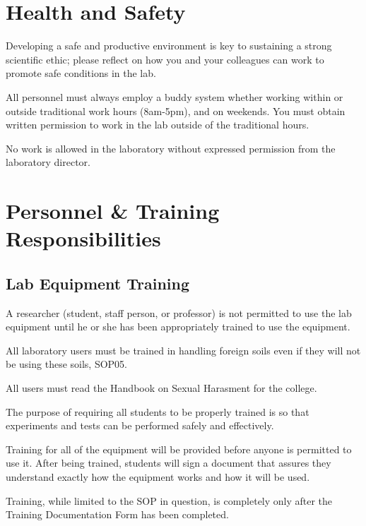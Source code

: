 \documentclass[12pt]{../SOP4_alpha}\usepackage[]{graphicx}\usepackage[]{color}
\begin{document}

\section{Health and Safety}

\NP Developing a safe and productive environment is key to sustaining a strong scientific ethic; please reflect on how you and your colleagues can work to promote safe conditions in the lab.

\NP All personnel must always employ a buddy system whether working within or outside traditional work hours (8am-5pm), and on weekends. You must obtain written permission to work in the lab outside of the traditional hours.

\NP No work is allowed in the laboratory without expressed permission from the laboratory director.

\section{Personnel \& Training Responsibilities}

\subsection*{Lab Equipment Training}

\NP A researcher (student, staff person, or professor) is not permitted to use the lab equipment until he or she has been appropriately trained to use the equipment.

\NP All laboratory users must be trained in handling foreign soils even if they will not be using these soils, SOP05.

\NP All users must read the Handbook on Sexual Harasment for the college.

\NP The purpose of requiring all students to be properly trained is so that experiments and tests can be performed safely and effectively.  

\NP Training for all of the equipment will be provided before anyone is permitted to use it.  After being trained, students will sign a document that assures they understand exactly how the equipment works and how it will be used.

\NP Training, while limited to the SOP in question, is completely only after the Training Documentation Form has been completed.
\end{document}
